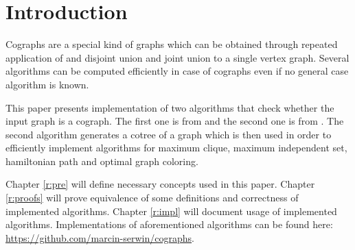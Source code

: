 
\chapter*{Introduction}

Cographs are a special kind of graphs which can be obtained through repeated application of and disjoint union and joint union to a single vertex graph. Several algorithms can be computed efficiently in case of cographs even if no general case algorithm is known.

This paper presents implementation of two algorithms that check whether the input graph is a cograph. The first one is from \cite{habib} and the second one is from \cite{corneil}. The second algorithm generates a cotree of a graph which is then used in order to efficiently implement algorithms for maximum clique, maximum independent set, hamiltonian  path and optimal graph coloring.

Chapter \ref{r:pre} will define necessary concepts used in this paper. Chapter \ref{r:proofs} will prove equivalence of some definitions and correctness of implemented algorithms. Chapter \ref{r:impl} will document usage of implemented algorithms. Implementations of aforementioned algorithms can be found here: \url{https://github.com/marcin-serwin/cographs}.

